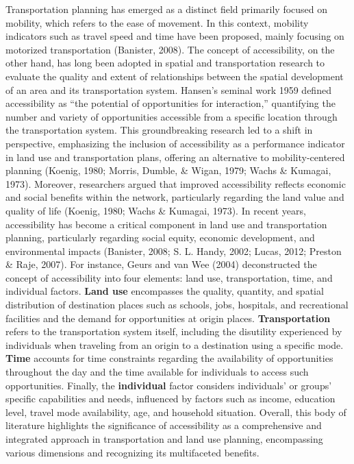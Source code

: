 \documentclass[
11pt, %
oneside, %
english, %
singlespacing, %
]{macthesis} %
\begin{document}
Transportation planning has emerged as a distinct field primarily focused on mobility, which refers to the ease of movement. In this context, mobility indicators such as travel speed and time have been proposed, mainly focusing on motorized transportation (Banister, 2008). The concept of accessibility, on the other hand, has long been adopted in spatial and transportation research to evaluate the quality and extent of relationships between the spatial development of an area and its transportation system. Hansen's seminal work 1959 defined accessibility as ``the potential of opportunities for interaction,'' quantifying the number and variety of opportunities accessible from a specific location through the transportation system. This groundbreaking research led to a shift in perspective, emphasizing the inclusion of accessibility as a performance indicator in land use and transportation plans, offering an alternative to mobility-centered planning (Koenig, 1980; Morris, Dumble, \& Wigan, 1979; Wachs \& Kumagai, 1973). Moreover, researchers argued that improved accessibility reflects economic and social benefits within the network, particularly regarding the land value and quality of life (Koenig, 1980; Wachs \& Kumagai, 1973). In recent years, accessibility has become a critical component in land use and transportation planning, particularly regarding social equity, economic development, and environmental impacts (Banister, 2008; S. L. Handy, 2002; Lucas, 2012; Preston \& Raje, 2007). For instance, Geurs and van Wee (2004) deconstructed the concept of accessibility into four elements: land use, transportation, time, and individual factors. \textbf{Land use} encompasses the quality, quantity, and spatial distribution of destination places such as schools, jobs, hospitals, and recreational facilities and the demand for opportunities at origin places. \textbf{Transportation} refers to the transportation system itself, including the disutility experienced by individuals when traveling from an origin to a destination using a specific mode. \textbf{Time} accounts for time constraints regarding the availability of opportunities throughout the day and the time available for individuals to access such opportunities. Finally, the \textbf{individual} factor considers individuals' or groups' specific capabilities and needs, influenced by factors such as income, education level, travel mode availability, age, and household situation. Overall, this body of literature highlights the significance of accessibility as a comprehensive and integrated approach in transportation and land use planning, encompassing various dimensions and recognizing its multifaceted benefits.
\end{document}
